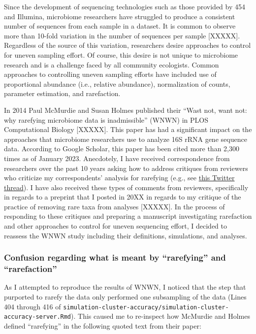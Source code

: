 \documentclass[
]{article}
\begin{document}
Since the development of sequencing technologies such as those provided
by 454 and Illumina, microbiome researchers have struggled to produce a
consistent number of sequences from each sample in a dataset. It is
common to observe more than 10-fold variation in the number of sequences
per sample {[}XXXXX{]}. Regardless of the source of this variation,
researchers desire approaches to control for uneven sampling effort. Of
course, this desire is not unique to microbiome research and is a
challenge faced by all community ecologists. Common approaches to
controlling uneven sampling efforts have included use of proportional
abundance (i.e., relative abundance), normalization of counts, parameter
estimation, and rarefaction.

In 2014 Paul McMurdie and Susan Holmes published their ``Wast not, want
not: why rarefying microbiome data is inadmissible'' (WNWN) in PLOS
Computational Biology {[}XXXXX{]}. This paper has had a significant
impact on the approaches that microbiome researchers use to analyze 16S
rRNA gene sequence data. According to Google Scholar, this paper has
been cited more than 2,300 times as of January 2023. Anecdotely, I have
received correspondence from researchers over the past 10 years asking
how to address critiques from reviewers who criticize my correspondents'
analysis for rarefying (e.g., see
\href{https://twitter.com/inanna_nalytica/status/1264679859672006656}{this
Twitter thread}). I have also received these types of comments from
reviewers, specifically in regards to a preprint that I posted in 20XX
in regards to my critique of the practice of removing rare taxa from
analyses {[}XXXXX{]}. In the process of responding to these critiques
and preparing a manuscript investigating rarefaction and other
approaches to control for uneven sequencing effort, I decided to
reassess the WNWN study including their definitions, simulations, and
analyses.

\hypertarget{confusion-regarding-what-is-meant-by-rarefying-and-rarefaction}{%
\subsubsection{Confusion regarding what is meant by ``rarefying'' and
``rarefaction''}\label{confusion-regarding-what-is-meant-by-rarefying-and-rarefaction}}

As I attempted to reproduce the results of WNWN, I noticed that the step
that purported to rarefy the data only performed one subsampling of the
data (Lines 404 through 416 of
\texttt{simulation-cluster-accuracy/simulation-cluster-accuracy-server.Rmd}).
This caused me to re-inspect how McMurdie and Holmes defined
``rarefying'' in the following quoted text from their paper:
\end{document}
